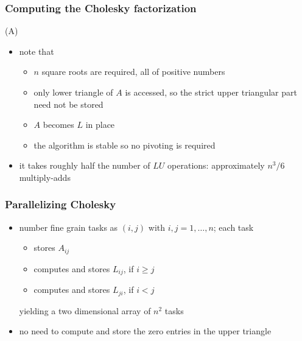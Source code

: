 \begin{frame}[fragile]
%
  \frametitle{Computing the Cholesky factorization}
%
    \begin{center}
      \begin{minipage}{.85\linewidth}
        \begin{algorithm}[H]
          \label{alg:cholesky}
%
          \DontPrintSemicolon
          \SetAlCapHSkip{0ex}
%
          \caption{\cholesky(A)}
%
%
        \end{algorithm}
      \end{minipage}
    \end{center}
%
  \begin{itemize}
%
  \item note that
    \begin{itemize}
    \item $n$ square roots are required, all of positive numbers 
    \item only lower triangle of $A$ is accessed, so the strict upper triangular part need not
      be stored
    \item $A$ becomes $L$ in place
    \item the algorithm is stable so no pivoting is required
    \end{itemize}
%
  \item it takes roughly half the number of $LU$ operations: approximately $n^{3}/6$
    multiply-adds
  \end{itemize}
%
\end{frame}

\begin{frame}[fragile]
%
  \frametitle{Parallelizing Cholesky}
%
  \begin{itemize}
%
  \item number fine grain tasks as $(i,j)$ with $i,j = 1, \ldots, n$; each task
    \begin{itemize}
    \item stores $A_{ij}$
    \item computes and stores $L_{ij}$, if $i \geq j$
    \item computes and stores $L_{ji}$, if $i < j$
    \end{itemize}
    yielding a two dimensional array of $n^{2}$ tasks
%
  \item no need to compute and store the zero entries in the upper triangle
%
  \end{itemize}
%
\end{frame}

